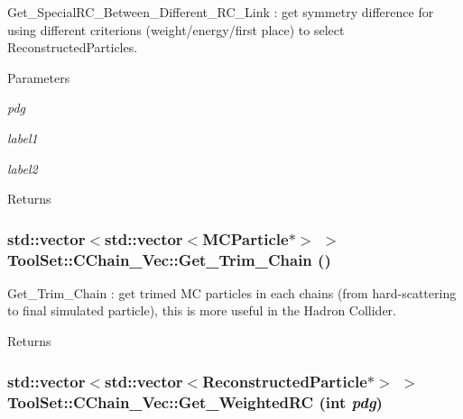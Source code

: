 Get\_\-SpecialRC\_\-Between\_\-Different\_\-RC\_\-Link : get symmetry difference for using different criterions (weight/energy/first place) to select ReconstructedParticles. 
\begin{DoxyParams}{Parameters}
\item[{\em pdg}]\item[{\em label1}]\item[{\em label2}]\end{DoxyParams}
\begin{DoxyReturn}{Returns}

\end{DoxyReturn}
\hypertarget{classToolSet_1_1CChain__Vec_ad96b299f6d9bf91831d20d0aac3d32ba}{
\subsubsection[{Get\_\-Trim\_\-Chain}]{\setlength{\rightskip}{0pt plus 5cm}std::vector$<$std::vector$<$MCParticle$\ast$$>$ $>$ ToolSet::CChain\_\-Vec::Get\_\-Trim\_\-Chain ()}}
\label{classToolSet_1_1CChain__Vec_ad96b299f6d9bf91831d20d0aac3d32ba}


Get\_\-Trim\_\-Chain : get trimed MC particles in each chains (from hard-\/scattering to final simulated particle), this is more useful in the Hadron Collider. \begin{DoxyReturn}{Returns}

\end{DoxyReturn}
\hypertarget{classToolSet_1_1CChain__Vec_a603890a7bfff43b56cb6eba14e81fee2}{
\subsubsection[{Get\_\-WeightedRC}]{\setlength{\rightskip}{0pt plus 5cm}std::vector$<$std::vector$<$ReconstructedParticle$\ast$$>$ $>$ ToolSet::CChain\_\-Vec::Get\_\-WeightedRC (int {\em pdg})}}
\label{classToolSet_1_1CChain__Vec_a603890a7bfff43b56cb6eba14e81fee2}


